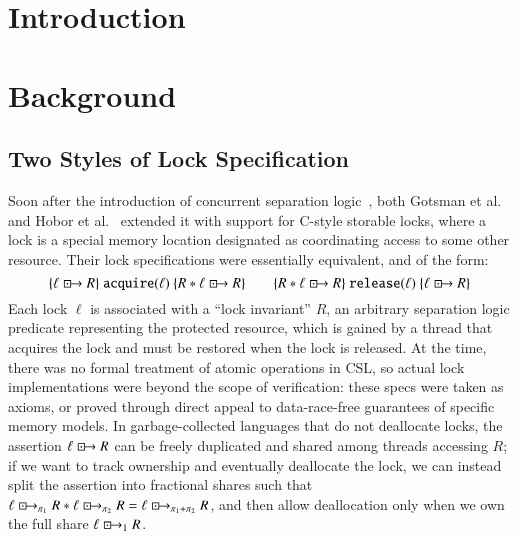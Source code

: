 \documentclass[runningheads]{llncs}
\newcommand{\islock}{\boxdotright}
\begin{document}
\section{Introduction}


\section{Background}
\label{background}

\subsection{Two Styles of Lock Specification}
Soon after the introduction of concurrent separation logic~\cite{csl}, both Gotsman et al.~\cite{gotsman} and Hobor et al.~\cite{oraclesematic} extended it with support for C-style storable locks, where a lock is a special memory location designated as coordinating access to some other resource. Their lock specifications were essentially equivalent, and of the form:
$$\{ \ell \islock R \}\ \texttt{acquire}(\ell)\ \{ R * \ell \islock R \} \qquad \{ R * \ell \islock R \}\ \texttt{release}(\ell)\ \{ \ell \islock R \}$$
Each lock $\ell$ is associated with a ``lock invariant'' $R$, an arbitrary separation logic predicate representing the protected resource, which is gained by a thread that acquires the lock and must be restored when the lock is released. At the time, there was no formal treatment of atomic operations in CSL, so actual lock implementations were beyond the scope of verification: these specs were taken as axioms, or proved through direct appeal to data-race-free guarantees of specific memory models. In garbage-collected languages that do not deallocate locks, the assertion $\ell \islock R$ can be freely duplicated and shared among threads accessing $R$; if we want to track ownership and eventually deallocate the lock, we can instead split the assertion into fractional shares such that $\ell \islock_{\pi_1} R * \ell \islock_{\pi_2} R = \ell \islock_{\pi_1 + \pi_2} R$, and then allow deallocation only when we own the full share $\ell \islock_1 R$.
\end{document}
